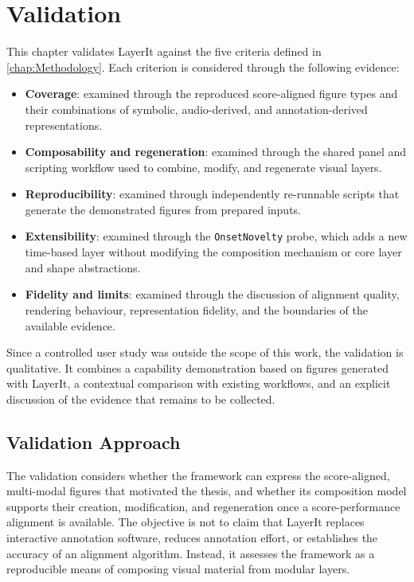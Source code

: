 \chapter{Validation} \label{chap:Validation}

This chapter validates LayerIt against the five criteria defined in \autoref{chap:Methodology}. Each criterion is considered through the following evidence:

\begin{itemize}
	\item \textbf{Coverage}: examined through the reproduced score-aligned figure types and their combinations of symbolic, audio-derived, and annotation-derived representations.
	\item \textbf{Composability and regeneration}: examined through the shared panel and scripting workflow used to combine, modify, and regenerate visual layers.
	\item \textbf{Reproducibility}: examined through independently re-runnable scripts that generate the demonstrated figures from prepared inputs.
	\item \textbf{Extensibility}: examined through the \texttt{OnsetNovelty} probe, which adds a new time-based layer without modifying the composition mechanism or core layer and shape abstractions.
	\item \textbf{Fidelity and limits}: examined through the discussion of alignment quality, rendering behaviour, representation fidelity, and the boundaries of the available evidence.
\end{itemize}

Since a controlled user study was outside the scope of this work, the validation is qualitative. It combines a capability demonstration based on figures generated with LayerIt, a contextual comparison with existing workflows, and an explicit discussion of the evidence that remains to be collected.

\section{Validation Approach}

The validation considers whether the framework can express the score-aligned, multi-modal figures that motivated the thesis, and whether its composition model supports their creation, modification, and regeneration once a score-performance alignment is available. The objective is not to claim that LayerIt replaces interactive annotation software, reduces annotation effort, or establishes the accuracy of an alignment algorithm. Instead, it assesses the framework as a reproducible means of composing visual material from modular layers.

